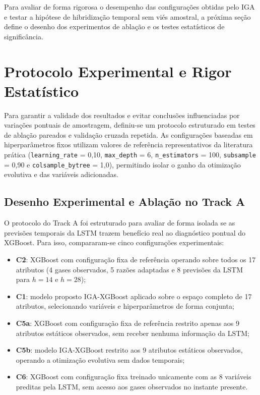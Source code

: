 Para avaliar de forma rigorosa o desempenho das configurações obtidas pelo IGA e testar a hipótese de hibridização temporal sem viés amostral, a próxima seção define o desenho dos experimentos de ablação e os testes estatísticos de significância.

\section{Protocolo Experimental e Rigor Estatístico}\label{sec:protocolo_experimental}

Para garantir a validade dos resultados e evitar conclusões influenciadas por variações pontuais de amostragem, definiu-se um protocolo estruturado em testes de ablação pareados e validação cruzada repetida. As configurações baseadas em hiperparâmetros fixos utilizam valores de referência representativos da literatura prática (\texttt{learning\_rate} = 0,10, \texttt{max\_depth} = 6, \texttt{n\_estimators} = 100, \texttt{subsample} = 0,90 e \texttt{colsample\_bytree} = 1,0), permitindo isolar o ganho da otimização evolutiva e das variáveis adicionadas.

\subsection{Desenho Experimental e Ablação no Track A}

O protocolo do Track A foi estruturado para avaliar de forma isolada se as previsões temporais da LSTM trazem benefício real ao diagnóstico pontual do XGBoost. Para isso, compararam-se cinco configurações experimentais:
\begin{itemize}
    \item \textbf{C2}: XGBoost com configuração fixa de referência operando sobre todos os 17 atributos (4 gases observados, 5 razões adaptadas e 8 previsões da LSTM para $h=14$ e $h=28$);
    \item \textbf{C1}: modelo proposto IGA-XGBoost aplicado sobre o espaço completo de 17 atributos, selecionando variáveis e hiperparâmetros de forma conjunta;
    \item \textbf{C5a}: XGBoost com configuração fixa de referência restrito apenas aos 9 atributos estáticos observados, sem receber nenhuma informação da LSTM;
    \item \textbf{C5b}: modelo IGA-XGBoost restrito aos 9 atributos estáticos observados, operando a otimização evolutiva sem dados temporais;
    \item \textbf{C6}: XGBoost com configuração fixa treinado unicamente com as 8 variáveis preditas pela LSTM, sem acesso aos gases observados no instante presente.
\end{itemize}

